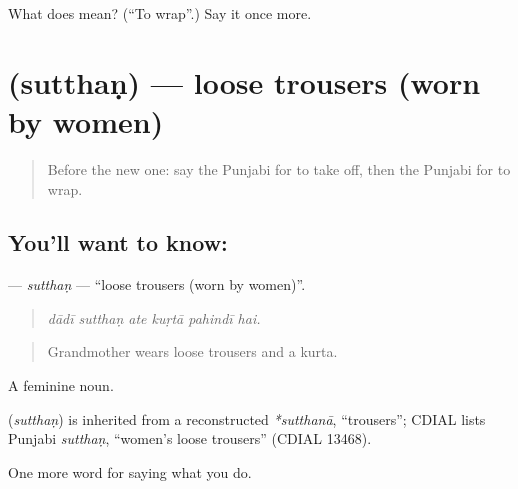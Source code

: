 \begin{tcolorbox}[breakable,colback=teal!4,colframe=teal!35!black,title={Before you move on}]
What does  mean? (\textquotedblleft{}To wrap\textquotedblright{}.) Say it once more.
\end{tcolorbox}
\section[\texorpdfstring{\pa{ਸੁੱਥਣ} (sutthaṇ)}{ਸੁੱਥਣ (sutthaṇ)}]{ (sutthaṇ) — loose trousers (worn by women)}

\label{lesson:PA-C230-sutthan}



\begin{quote}
Before the new one: say the Punjabi for to take off, then the Punjabi for to wrap.
\end{quote}

\subsection*{You'll want to know: }
\textbf{} — \emph{sutthaṇ} — \textquotedblleft{}loose trousers (worn by women)\textquotedblright{}.

\begin{quote}
     
\end{quote}

\begin{quote}
\emph{dādī sutthaṇ ate kuṛtā pahindī hai.}
\end{quote}

\begin{quote}
Grandmother wears loose trousers and a kurta.
\end{quote}

A feminine noun.

\begin{cousinweb}
\textbf{} (\emph{sutthaṇ}) is inherited from a reconstructed \emph{*sutthanā}, \textquotedblleft{}trousers\textquotedblright{}; CDIAL lists Punjabi \emph{sutthaṇ}, \textquotedblleft{}women's loose trousers\textquotedblright{} (CDIAL 13468).
\end{cousinweb}

\begin{grammarlens}[title={What you've built}]
One more word for saying what you do.
\end{grammarlens}

